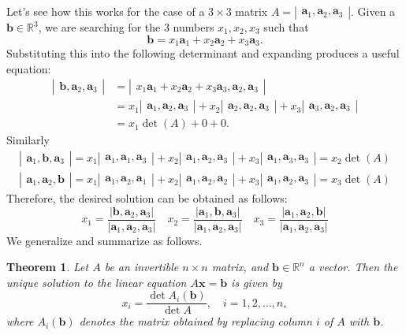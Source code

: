 \documentclass[12pt]{article}
\newcommand{\ba}{\mathbf{a}}
\newcommand{\bb}{\mathbf{b}}
\newcommand{\bx}{\mathbf{x}}
\newcommand{\R}{\mathbb{R}}
\newcommand{\vmat}[1]{\left|\begin{matrix}#1\end{matrix}\right|}
\newtheorem{theorem}{Theorem}
\begin{document}
Let's
see how this works for the case of a $3\times 3$ matrix $A=
\vmat{\ba_1, \ba_2, \ba_3}$.  Given a $\bb\in \R^3$, we are searching
for the $3$ numbers 
$x_1, x_2, x_3$ such that
\[ \bb = x_1 \ba_1+ x_2 \ba_2 + x_3\ba_3.\] Substituting this into the
following determinant and expanding produces a useful equation:
\begin{align*}
    \vmat{ \bb, \ba_2, \ba_3} &=  \vmat{x_1 \ba_1 + x_2 \ba_2 + x_3
      \ba_3, \ba_2, \ba_3}\\
    &=    x_1 \vmat{\ba_1, \ba_2, \ba_3} + x_2\vmat{ \ba_2, \ba_2, \ba_3} + 
    x_3 \vmat{\ba_3,\ba_2, \ba_3} \\
    &= x_1 \det(A) + 0 + 0.
\end{align*}
Similarly
\begin{align*}
  \vmat{\ba_1, \bb, \ba_3} = x_1 \vmat{\ba_1, \ba_1, \ba_3} +
  x_2\vmat{ \ba_1, \ba_2, \ba_3} +
  x_3 \vmat{\ba_1,\ba_3, \ba_3} = x_2 \det(A)\\
  \vmat{\ba_1, \ba_2, \bb} =x_1 \vmat{\ba_1, \ba_2, \ba_1} + x_2\vmat{
    \ba_1, \ba_2, \ba_2} +
  x_3 \vmat{\ba_1,\ba_2, \ba_3} =  x_3 \det(A)
\end{align*}
Therefore, the desired solution can be obtained as follows:
\[
    x_1 =  \frac{|\bb,\ba_2,\ba_3|}{|\ba_1, \ba_2, \ba_3|}\quad
    x_2 =  \frac{|\ba_1,\bb,\ba_3|}{|\ba_1, \ba_2, \ba_3|}\quad
    x_3 =  \frac{|\ba_1,\ba_2,\bb|}{|\ba_1, \ba_2, \ba_3|}
\]
We generalize and summarize as follows.
\begin{theorem}
  Let $A$ be an invertible $n\times n$ matrix, and $\bb\in \R^n$ a
  vector.  Then the unique solution to the linear equation $A \bx=\bb$
  is given by
  \[ x_i = \frac{\det A_i(\bb)}{\det A},\quad i=1,2,\ldots,n ,\]
  where $A_i(\bb)$ denotes the matrix obtained by replacing column $i$
  of $A$ with $\bb$.
\end{theorem}

\end{document}
